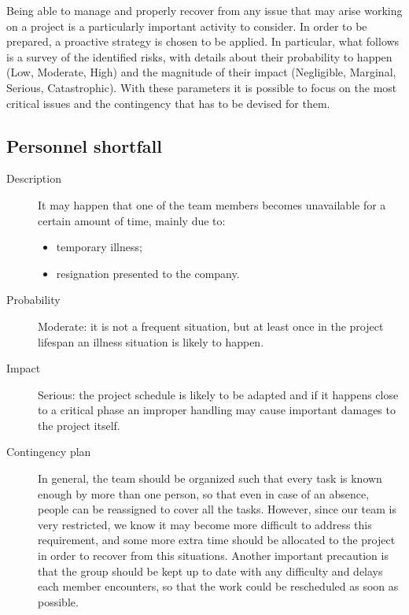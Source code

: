Being able to manage and properly recover from any issue that may arise working on a project is a particularly important activity to consider. In order to be prepared, a proactive strategy is chosen to be applied. In particular, what follows is a survey of the identified risks, with details about their probability to happen (Low, Moderate, High) and the magnitude of their impact (Negligible, Marginal, Serious, Catastrophic). With these parameters it is possible to focus on the most critical issues and the contingency that has to be devised for them.

\subsection*{Personnel shortfall}
	\begin{description}
		\item[Description] It may happen that one of the team members becomes unavailable for a certain amount of time, mainly due to:
			\begin{itemize}
				\item temporary illness;
				\item resignation presented to the company.
			\end{itemize}
		\item[Probability] Moderate: it is not a frequent situation, but at least once in the project lifespan an illness situation is likely to happen.
		\item[Impact] Serious: the project schedule is likely to be adapted and if it happens close to a critical phase an improper handling may cause important damages to the project itself.
		\item[Contingency plan] In general, the team should be organized such that every task is known enough by more than one person, so that even in case of an absence, people can be reassigned to cover all the tasks. However, since our team is very restricted, we know it may become more difficult to address this requirement, and some more extra time should be allocated to the project in order to recover from this situations. Another important precaution is that the group should be kept up to date with any difficulty and delays each member encounters, so that the work could be rescheduled as soon as possible.
	\end{description}

